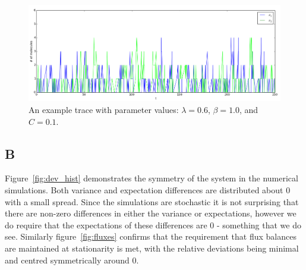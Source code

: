 \documentclass[a4paper,12pt]{article}
\begin{document}
\begin{figure}[!ht]
\centering
        \includegraphics[scale=0.45]{images/trace}
                \caption{An example trace with parameter values: $\lambda=0.6$, $\beta=1.0$, and $C=0.1$.}
                \label{fig:trace}
                
\end{figure}
        
\subsection*{B}
Figure~\ref{fig:dev_hist} demonstrates the symmetry of the system in the numerical simulations. Both variance and expectation differences are distributed about 0 with a small spread. Since the simulations are stochastic it is not surprising that there are non-zero differences in either the variance or expectations, however we do require that the expectations of these differences are 0  - something that we do see. Similarly figure~\ref{fig:fluxes} confirms that the requirement that flux balances are maintained at stationarity is met, with the relative deviations being minimal and centred symmetrically around 0.

\end{document}
